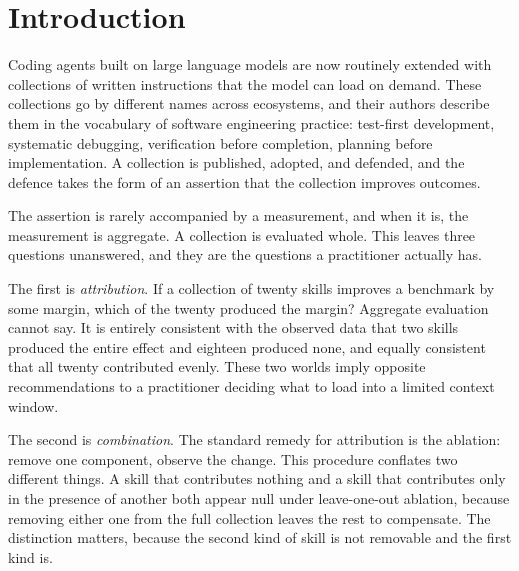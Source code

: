 \documentclass[11pt]{article}
\theoremstyle{plain}
\theoremstyle{definition}
\theoremstyle{remark}
\begin{document}
\begin{abstract}
Existing work has applied this style of attribution to four or five hand-chosen agent modules. The contribution here is doing it at the scale of a real published catalogue, on collections practitioners actually install, and distinguishing a skill that was offered from a skill that was used. I predict that a small minority of skills accounts for most of the measurable gain, that many contribute nothing distinguishable from zero, that the gap between offered and used is large enough to reorder the ranking, and that which skills are loaded matters more for performance, and for what performance costs, than how large the collection is or who wrote it.
\end{abstract}

\section{Introduction}

Coding agents built on large language models are now routinely extended with collections of written instructions that the model can load on demand. These collections go by different names across ecosystems, and their authors describe them in the vocabulary of software engineering practice: test-first development, systematic debugging, verification before completion, planning before implementation. A collection is published, adopted, and defended, and the defence takes the form of an assertion that the collection improves outcomes.

The assertion is rarely accompanied by a measurement, and when it is, the measurement is aggregate. A collection is evaluated whole. This leaves three questions unanswered, and they are the questions a practitioner actually has.

The first is \emph{attribution}. If a collection of twenty skills improves a benchmark by some margin, which of the twenty produced the margin? Aggregate evaluation cannot say. It is entirely consistent with the observed data that two skills produced the entire effect and eighteen produced none, and equally consistent that all twenty contributed evenly. These two worlds imply opposite recommendations to a practitioner deciding what to load into a limited context window.

The second is \emph{combination}. The standard remedy for attribution is the ablation: remove one component, observe the change. This procedure conflates two different things. A skill that contributes nothing and a skill that contributes only in the presence of another both appear null under leave-one-out ablation, because removing either one from the full collection leaves the rest to compensate. The distinction matters, because the second kind of skill is not removable and the first kind is.
\end{document}
